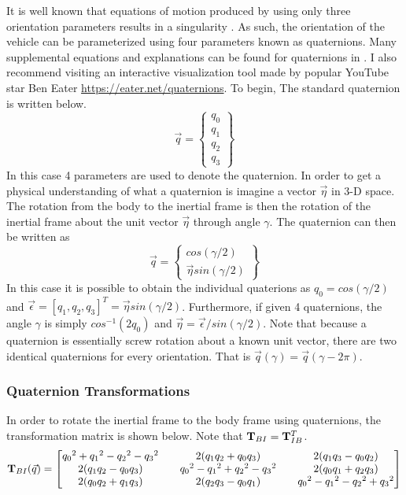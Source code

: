 \documentclass{article}
\begin{document}
It is well known that equations of motion produced by using only three
orientation parameters results in a singularity \cite{etkins}. As
such, the orientation of the vehicle can be parameterized using four
parameters known as quaternions. Many supplemental equations and
explanations can be found for quaternions in
\cite{Lin,Filipe,multibody,quaternions,cassidis,Munoz,Markley,Liu_Estimation}. I
also recommend visiting an interactive visualization tool made by
popular YouTube star Ben Eater \url{https://eater.net/quaternions}. To
begin, The standard quaternion is written below.
\begin{equation}
  \vec{q} = \begin{Bmatrix} q_0 \\ q_1 \\ q_2 \\ q_3 \end{Bmatrix}
\end{equation}
In this case 4 parameters are used to denote the quaternion. In order
to get a physical understanding of what a quaternion is imagine a
vector $\vec{\eta}$ in 3-D space. The rotation from the body to the
inertial frame is then the rotation of the inertial frame about the
unit vector $\vec{\eta}$ through angle $\gamma$. The quaternion can
then be written as
\begin{equation}
  \vec{q} = \begin{Bmatrix} cos(\gamma/2)
    \\ \vec{\eta}sin(\gamma/2) \end{Bmatrix}
\end{equation}
In this case it is possible to obtain the individual quaterions as
$q_0 = cos(\gamma/2)$ and $\vec{\epsilon} = [q_1,q_2,q_3]^T =
\vec{\eta}sin(\gamma/2)$. Furthermore, if given 4 quaternions, the
angle $\gamma$ is simply $cos^{-1}(2q_0)$ and
$\vec{\eta}=\vec{\epsilon}/sin(\gamma/2)$. Note that because a quaternion is
essentially screw rotation about a known unit vector, there are two
identical quaternions for every orientation. That is $\vec{q}(\gamma) = \vec{q}(\gamma-2\pi)$.

\subsubsection{Quaternion Transformations}

In order to rotate the inertial frame to the
body frame using quaternions, the transformation matrix is shown
below. Note that ${\bf T}_{BI}={\bf T}_{IB}^T$. 
\begin{equation}
  {\bf T}_{BI}(\vec{q}) = \begin{bmatrix}
    {q_0}^2 + {q_1}^2 - {q_2}^2 - {q_3}^2 && 2(q_1q_2+q_0q_3) && 2(q_1q_3-q_0q_2)\\
    2(q_1q_2-q_0q_3) && {q_0}^2 - {q_1}^2 + {q_2}^2 - {q_3}^2 && 2(q_0q_1+q_2q_3)\\
    2(q_0q_2+q_1q_3) && 2(q_2q_3-q_0q_1) && {q_0}^2 - {q_1}^2 - {q_2}^2 + {q_3}^2
  \end{bmatrix}
\end{equation}
\end{document}
